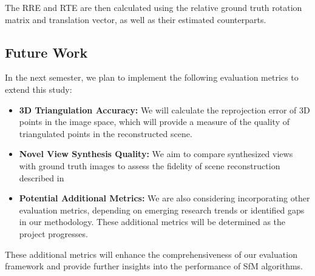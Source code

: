 The RRE and RTE are then calculated using the relative ground truth rotation matrix and translation vector, as well as their estimated counterparts.


\subsection{Future Work}
In the next semester, we plan to implement the following evaluation metrics to extend this study:
\begin{itemize}
    \item \textbf{3D Triangulation Accuracy:} We will calculate the reprojection error of 3D points in the image space, which will provide a measure of the quality of triangulated points in the reconstructed scene.
    \item \textbf{Novel View Synthesis Quality:} We aim to compare synthesized views with ground truth images to assess the fidelity of scene reconstruction described in \cite{DBLP:journals/corr/WaechterBFMKG16}
    \item \textbf{Potential Additional Metrics:} We are also considering incorporating other evaluation metrics, depending on emerging research trends or identified gaps in our methodology. These additional metrics will be determined as the project progresses.
\end{itemize}

These additional metrics will enhance the comprehensiveness of our evaluation framework and provide further insights into the performance of SfM algorithms.